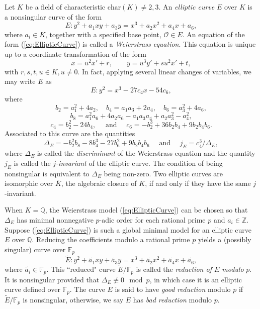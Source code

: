 Let $K$ be a field of characteristic $\text{char}(K) \neq 2,3$. An \textit{elliptic curve} $E$ over $K$ is a nonsingular curve of the form 
\begin{equation} \label{eq:EllipticCurve}
E: y^2 + a_1xy + a_3y = x^3 + a_2x^2 + a_4x + a_6,
\end{equation}
where $a_i \in K$, together with a specified base point, $\mathcal{O}\in E$. An equation of the form (\ref{eq:EllipticCurve}) is called a \textit{Weierstrass equation}. This equation is unique up to a coordinate transformation of the form
\[x = u^2x' + r, \quad\quad y = u^3y' + su^2x' + t, \]
with $r,s,t,u \in K, u\neq 0$. 
In fact, applying several linear changes of variables, we may write $E$ as
\[E: y^2 = x^3 - 27c_4x - 54c_6,\]
where
\[b_2 = a_1^2 + 4a_2, \quad b_4 = a_1a_3 + 2a_4, \quad b_6 = a_3^2 + 4a_6,\]
\[b_8 = a_1^2a_6 + 4a_2a_6 - a_1a_3a_4 + a_2a_3^2 - a_4^2,\]
\[ c_4 = b_2^2 - 24b_4, \quad \text{ and } \quad c_6 = -b_2^3 + 36b_2b_4 + 9b_2b_4b_6.\]
Associated to this curve are the quantities 
\[\Delta_E = -b_2^2b_8 - 8b_4^3 - 27b_6^2 + 9b_2b_4b_6 \quad \text{ and } \quad j_E = c_4^3/\Delta_E,\]
where $\Delta_E$ is called the \textit{discriminant} of the Weierstrass equation and the quantity $j_E$ is called the \textit{$j$-invariant} of the elliptic curve. The condition of being nonsingular is equivalent to $\Delta_E$ being non-zero. Two elliptic curves are isomorphic over $\bar{K}$, the algebraic closure of $K$, if and only if they have the same $j$-invariant.

When $K = \mathbb{Q}$, the Weierstrass model (\ref{eq:EllipticCurve}) can be chosen so that $\Delta_E$ has minimal nonnegative $p$-adic order for each rational prime $p$ and $a_i \in \mathbb{Z}$. Suppose (\ref{eq:EllipticCurve}) is such a global minimal model for an elliptic curve $E$ over $\mathbb{Q}$. Reducing the coefficients modulo a rational prime $p$ yields a (possibly singular) curve over $\mathbb{F}_p$
\begin{equation}
\tilde{E}: y^2 + \tilde{a_1}xy + \tilde{a_3}y = x^3 + \tilde{a_2}x^2 + \tilde{a_4}x + \tilde{a_6},
\end{equation}
where $\tilde{a_i} \in \mathbb{F}_p$. This ``reduced" curve $\tilde{E}/\mathbb{F}_p$ is called the \textit{reduction of $E$ modulo} $p$. It is nonsingular provided that $\Delta_E \not \equiv 0 \mod{p}$, in which case it is an elliptic curve defined over $\mathbb{F}_p$. The curve $E$ is said to have \textit{good reduction} modulo $p$ if $\tilde{E}/\mathbb{F}_p$ is nonsingular, otherwise, we say $E$ has \textit{bad reduction} modulo $p$. 

